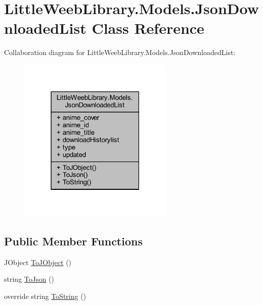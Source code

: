 \hypertarget{class_little_weeb_library_1_1_models_1_1_json_downloaded_list}{}\section{Little\+Weeb\+Library.\+Models.\+Json\+Downloaded\+List Class Reference}
\label{class_little_weeb_library_1_1_models_1_1_json_downloaded_list}


Collaboration diagram for Little\+Weeb\+Library.\+Models.\+Json\+Downloaded\+List\+:\nopagebreak
\begin{figure}[H]
\begin{center}
\leavevmode
\includegraphics[width=210pt]{class_little_weeb_library_1_1_models_1_1_json_downloaded_list__coll__graph}
\end{center}
\end{figure}
\subsection*{Public Member Functions}
\begin{DoxyCompactItemize}
\item 
J\+Object \mbox{\hyperlink{class_little_weeb_library_1_1_models_1_1_json_downloaded_list_a97de2493e2a60e3d98bd480c311a08b9}{To\+J\+Object}} ()
\item 
string \mbox{\hyperlink{class_little_weeb_library_1_1_models_1_1_json_downloaded_list_a3c84d87443d03e22ba63bbbd4f81b8b2}{To\+Json}} ()
\item 
override string \mbox{\hyperlink{class_little_weeb_library_1_1_models_1_1_json_downloaded_list_a85d819ca67ad513254f77d395eef4816}{To\+String}} ()
\end{DoxyCompactItemize}
